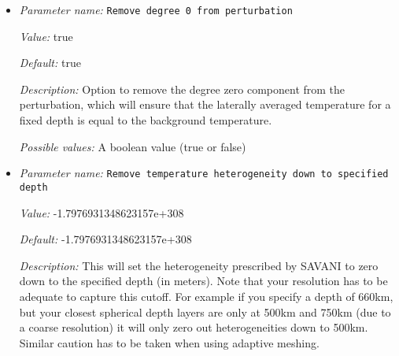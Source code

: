 \begin{itemize}
{\it Value:} 1600.0


{\it Default:} 1600.0


{\it Description:} The reference temperature that is perturbed by the spherical harmonic functions. Only used in incompressible models.


{\it Possible values:} A floating point number $v$ such that $0 \leq v \leq \text{MAX\_DOUBLE}$
\item {\it Parameter name:} {\tt Remove degree 0 from perturbation}
\label{parameters:Initial temperature model/SAVANI perturbation/Remove degree 0 from perturbation}
\label{parameters:Initial_20temperature_20model/SAVANI_20perturbation/Remove_20degree_200_20from_20perturbation}


{\it Value:} true


{\it Default:} true


{\it Description:} Option to remove the degree zero component from the perturbation, which will ensure that the laterally averaged temperature for a fixed depth is equal to the background temperature.


{\it Possible values:} A boolean value (true or false)
\item {\it Parameter name:} {\tt Remove temperature heterogeneity down to specified depth}
\label{parameters:Initial temperature model/SAVANI perturbation/Remove temperature heterogeneity down to specified depth}
\label{parameters:Initial_20temperature_20model/SAVANI_20perturbation/Remove_20temperature_20heterogeneity_20down_20to_20specified_20depth}


{\it Value:} -1.7976931348623157e+308


{\it Default:} -1.7976931348623157e+308


{\it Description:} This will set the heterogeneity prescribed by SAVANI to zero down to the specified depth (in meters). Note that your resolution has to be adequate to capture this cutoff. For example if you specify a depth of 660km, but your closest spherical depth layers are only at 500km and 750km (due to a coarse resolution) it will only zero out heterogeneities down to 500km. Similar caution has to be taken when using adaptive meshing.



\end{itemize}

